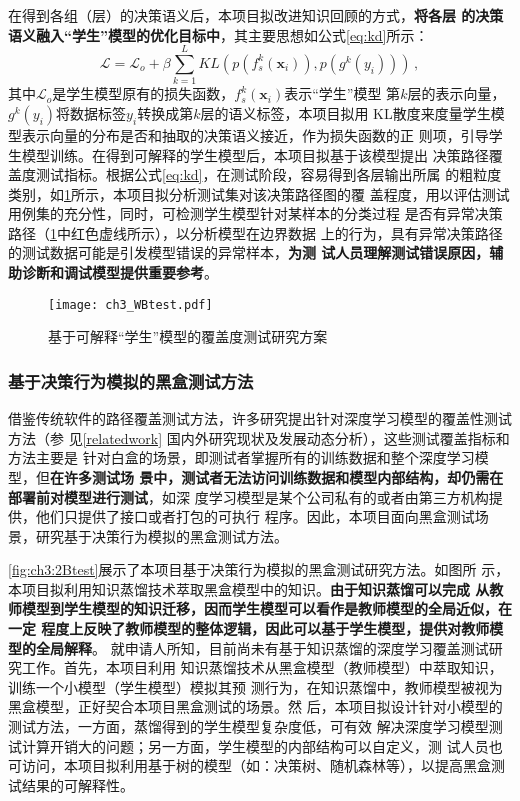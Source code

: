 在得到各组（层）的决策语义后，本项目拟改进知识回顾的方式，\textbf{将各层
的决策语义融入“学生”模型的优化目标中}，其主要思想如公式\eqref{eq:kd}所示：
\begin{equation}
    \mathcal{L} = \mathcal{L}_o + \beta\sum_{k=1}^L KL(p(f_s^k(\bm x_i)), p(g^k(y_i))) \,,
    \label{eq:kd}
\end{equation}
其中$\mathcal L_o$是学生模型原有的损失函数，$f_s^k(\bm x_i)$表示``学生''模型
第$k$层的表示向量，$g^k(y_i)$将数据标签$y_i$转换成第$k$层的语义标签，本项目拟用
KL散度来度量学生模型表示向量的分布是否和抽取的决策语义接近，作为损失函数的正
则项，引导学生模型训练。在得到可解释的学生模型后，本项目拟基于该模型提出
决策路径覆盖度测试指标。根据公式\eqref{eq:kd}，在测试阶段，容易得到各层输出所属
的粗粒度类别，{如\cref{fig:ch3:WBtest}所示，本项目拟分析测试集对该决策路径图的覆
盖程度，用以评估测试用例集的充分性，同时，可检测学生模型针对某样本的分类过程
是否有异常决策路径（\cref{fig:ch3:WBtest}中红色虚线所示），以分析模型在边界数据
上的行为}，具有异常决策路径的测试数据可能是引发模型错误的异常样本，\textbf{为测
试人员理解测试错误原因，辅助诊断和调试模型提供重要参考}。
\begin{figure}[htp]
    \begin{small}
        \begin{center}
            \texttt{[image: ch3\_WBtest.pdf]}
        \end{center}
        \caption{基于可解释``学生''模型的覆盖度测试研究方案}
        \label{fig:ch3:WBtest}
    \end{small}
\end{figure}

\subsubsection{基于决策行为模拟的黑盒测试方法}\label{ch3_1}

借鉴传统软件的路径覆盖测试方法，许多研究提出针对深度学习模型的覆盖性测试方法（参
见\ref{relatedwork} 国内外研究现状及发展动态分析），这些测试覆盖指标和方法主要是
针对白盒的场景，即测试者掌握所有的训练数据和整个深度学习模型，但\textbf{在许多测试场
景中，测试者无法访问训练数据和模型内部结构，却仍需在部署前对模型进行测试}，如深
度学习模型是某个公司私有的或者由第三方机构提供，他们只提供了接口或者打包的可执行
程序。因此，本项目面向黑盒测试场景，研究基于决策行为模拟的黑盒测试方法。

\cref{fig:ch3:2Btest}展示了本项目基于决策行为模拟的黑盒测试研究方法。如图所
示，本项目拟利用知识蒸馏技术萃取黑盒模型中的知识。\textbf{由于知识蒸馏可以完成
从教师模型到学生模型的知识迁移，因而学生模型可以看作是教师模型的全局近似，在一定
程度上反映了教师模型的整体逻辑，因此可以基于学生模型，提供对教师模型的全局解释}。
就申请人所知，目前尚未有基于知识蒸馏的深度学习覆盖测试研究工作。首先，本项目利用
知识蒸馏技术从黑盒模型（教师模型）中萃取知识，训练一个小模型（学生模型）模拟其预
测行为，在知识蒸馏中，教师模型被视为黑盒模型，正好契合本项目黑盒测试的场景。然
后，本项目拟设计针对小模型的测试方法，一方面，蒸馏得到的学生模型复杂度低，可有效
解决深度学习模型测试计算开销大的问题；另一方面，学生模型的内部结构可以自定义，测
试人员也可访问，本项目拟利用基于树的模型（如：决策树、随机森林等），以提高黑盒测
试结果的可解释性。

